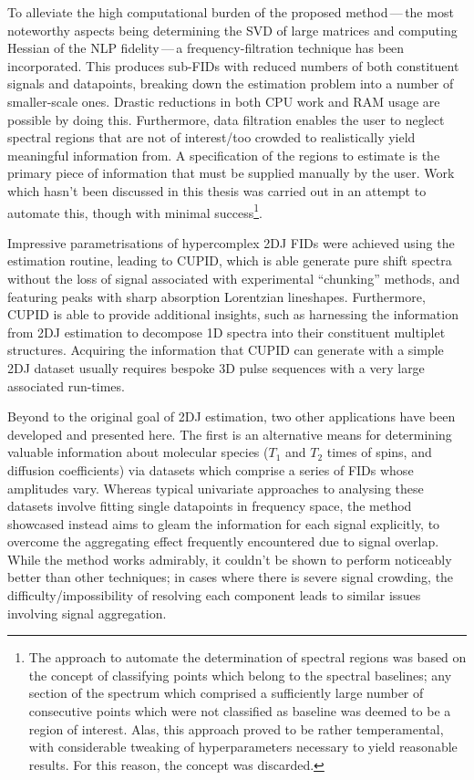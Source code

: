 To alleviate the high computational burden of the proposed method\,---\,the
most noteworthy aspects being determining the \ac{SVD} of large matrices and
computing Hessian of the \ac{NLP} fidelity\,---\,a frequency-filtration
technique has been incorporated. This produces sub-\acp{FID} with reduced
numbers of both constituent signals and datapoints, breaking down the
estimation problem into a number of smaller-scale ones.
Drastic reductions in both \ac{CPU} work and \ac{RAM} usage are possible by
doing this.
Furthermore, data filtration enables the user to neglect spectral regions
that are not of interest/too crowded to realistically yield meaningful
information from. A specification of the regions to estimate is the primary
piece of information that must be supplied manually by the user.
Work which hasn't been discussed in this thesis was carried out in an attempt to
automate this, though with minimal success\footnote{
    The approach to automate the determination of spectral regions was based on
    the concept of classifying points which belong to the spectral
    baselines\cite{Dietrich1991}; any section of the spectrum which comprised a
    sufficiently large number of consecutive points which were not classified
    as baseline was deemed to be a region of interest. Alas, this approach
    proved to be rather temperamental, with considerable tweaking of
    hyperparameters necessary to yield reasonable results. For this reason, the
    concept was discarded.
}.

Impressive parametrisations of hypercomplex \ac{2DJ} \acp{FID} were achieved using
the estimation routine, leading to \ac{CUPID}, which is able generate pure
shift spectra without the loss of signal associated with experimental
``chunking'' methods, and featuring peaks with sharp absorption Lorentzian
lineshapes.
Furthermore, \ac{CUPID} is able to provide additional insights, such as
harnessing the information from \ac{2DJ} estimation to decompose \ac{1D}
spectra into their constituent multiplet structures. Acquiring the information
that \ac{CUPID} can generate with a simple \ac{2DJ} dataset usually requires
bespoke \ac{3D} pulse sequences with a very large associated run-times.

Beyond to the original goal of \ac{2DJ} estimation, two other applications
have been developed and presented here. The first is an alternative means for
determining valuable information about molecular species ($T_1$ and  $T_2$
times of spins, and diffusion coefficients) via datasets which comprise a series
of \acp{FID} whose amplitudes vary. Whereas typical univariate
approaches to analysing these datasets involve fitting single datapoints in
frequency space, the method showcased instead aims to gleam the
information for each signal explicitly, to overcome the aggregating effect
frequently encountered due to signal overlap. While the method works admirably,
it couldn't be shown to perform noticeably better than other techniques; in
cases where there is severe signal crowding, the difficulty/impossibility of
resolving each component leads to similar issues involving signal aggregation.

